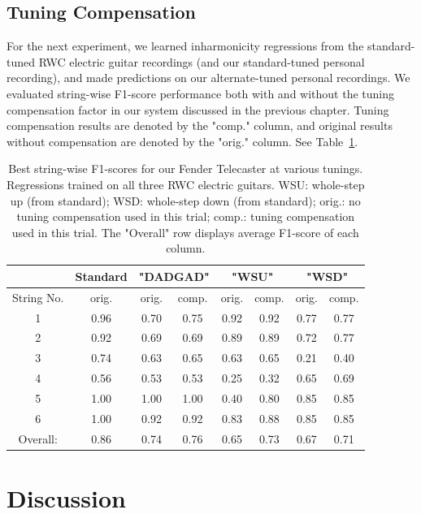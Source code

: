 \documentclass[12pt]{cmuthesis}
\begin{document}
\section{Tuning Compensation}
For the next experiment, we learned inharmonicity regressions from the standard-tuned RWC electric guitar recordings (and our standard-tuned personal recording), and made predictions on our alternate-tuned personal recordings. We evaluated string-wise F1-score performance both with and without the tuning compensation factor in our system discussed in the previous chapter. Tuning compensation results are denoted by the "comp." column, and original results without compensation are denoted by the "orig." column. See Table~\ref{tab:resultsTune}.

\begin{table}
\begin{center}
\begin{tabular}{||c||c||c|c||c|c||c|c||}
\hline
& Standard & \multicolumn{2}{|c|}{"DADGAD"} & \multicolumn{2}{|c|}{"WSU"} & \multicolumn{2}{|c|}{"WSD"} \\
\hline
String No. & orig. & orig. & comp. & orig. & comp. & orig. & comp. \\
\hline
1 & 0.96 & 0.70 & 0.75 & 0.92 & 0.92 & 0.77 & 0.77 \\
\hline
2 & 0.92 & 0.69 & 0.69 & 0.89 & 0.89 & 0.72 & 0.77\\
\hline
3 & 0.74 & 0.63 & 0.65 & 0.63 & 0.65 & 0.21 & 0.40\\
\hline
4 & 0.56 & 0.53 & 0.53 & 0.25 & 0.32 & 0.65 & 0.69 \\
\hline
5 & 1.00 & 1.00 & 1.00 & 0.40 & 0.80 & 0.85 & 0.85 \\
\hline
6 & 1.00 & 0.92 & 0.92 & 0.83 & 0.88 & 0.85 & 0.85\\ 
\hline
\hline
Overall: & 0.86 & 0.74 & 0.76 & 0.65 & 0.73 & 0.67 & 0.71\\
\hline
\end{tabular}
\caption{Best string-wise F1-scores for our Fender Telecaster at various tunings. Regressions trained on all three RWC electric guitars. WSU: whole-step up (from standard); WSD: whole-step down (from standard); orig.: no tuning compensation used in this trial; comp.: tuning compensation used in this trial. The "Overall" row displays average F1-score of each column.} 
\label{tab:resultsTune}
\end{center}
\end{table}


\noindent
\chapter{Discussion}
\end{document}
